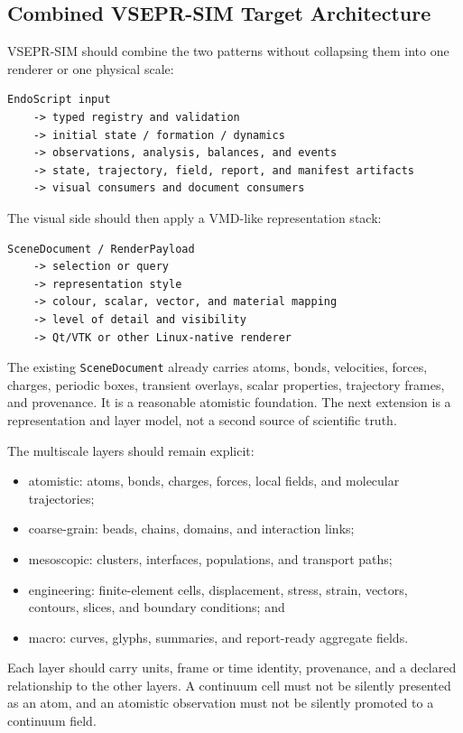 \documentclass[11pt,a4paper]{article}
\begin{document}
\subsection{Combined VSEPR-SIM Target Architecture}

VSEPR-SIM should combine the two patterns without collapsing them into one
renderer or one physical scale:

\begin{lstlisting}[style=cpp]
EndoScript input
    -> typed registry and validation
    -> initial state / formation / dynamics
    -> observations, analysis, balances, and events
    -> state, trajectory, field, report, and manifest artifacts
    -> visual consumers and document consumers
\end{lstlisting}

The visual side should then apply a VMD-like representation stack:

\begin{lstlisting}[style=cpp]
SceneDocument / RenderPayload
    -> selection or query
    -> representation style
    -> colour, scalar, vector, and material mapping
    -> level of detail and visibility
    -> Qt/VTK or other Linux-native renderer
\end{lstlisting}

The existing \texttt{SceneDocument} already carries atoms, bonds, velocities,
forces, charges, periodic boxes, transient overlays, scalar properties,
trajectory frames, and provenance.  It is a reasonable atomistic foundation.
The next extension is a representation and layer model, not a second source
of scientific truth.

The multiscale layers should remain explicit:

\begin{itemize}
  \item atomistic: atoms, bonds, charges, forces, local fields, and molecular
        trajectories;
  \item coarse-grain: beads, chains, domains, and interaction links;
  \item mesoscopic: clusters, interfaces, populations, and transport paths;
  \item engineering: finite-element cells, displacement, stress, strain,
        vectors, contours, slices, and boundary conditions; and
  \item macro: curves, glyphs, summaries, and report-ready aggregate fields.
\end{itemize}

Each layer should carry units, frame or time identity, provenance, and a
declared relationship to the other layers.  A continuum cell must not be
silently presented as an atom, and an atomistic observation must not be
silently promoted to a continuum field.
\end{document}
